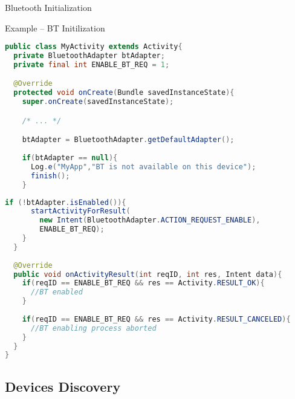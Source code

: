\documentclass{beamer}
\begin{document}
\begin{frame}{Bluetooth Initialization}
    \begin{exampleblock}{Example -- BT Initilization}
      \begin{lstlisting}[language=Java]
public class MyActivity extends Activity{
  private BluetoothAdapter btAdapter;
  private final int ENABLE_BT_REQ = 1;

  @Override 
  protected void onCreate(Bundle savedInstanceState){
    super.onCreate(savedInstanceState);

    /* ... */

    btAdapter = BluetoothAdapter.getDefaultAdapter();
    
    if(btAdapter == null){
      Log.e("MyApp","BT is not available on this device");
      finish();
    }
      \end{lstlisting}
    \end{exampleblock}		
    \begin{exampleblock}{\vspace{-10pt}}
      \begin{lstlisting}[language=Java]
    if (!btAdapter.isEnabled()){
      startActivityForResult(
        new Intent(BluetoothAdapter.ACTION_REQUEST_ENABLE),
        ENABLE_BT_REQ);
    }
  }
  
  @Override
  public void onActivityResult(int reqID, int res, Intent data){
    if(reqID == ENABLE_BT_REQ && res == Activity.RESULT_OK){
      //BT enabled
    }
        
    if(reqID == ENABLE_BT_REQ && res == Activity.RESULT_CANCELED){
      //BT enabling process aborted
    }
  }
}
      \end{lstlisting}
    \end{exampleblock}
  \end{frame}

\subsection{Devices Discovery}
\end{document}
